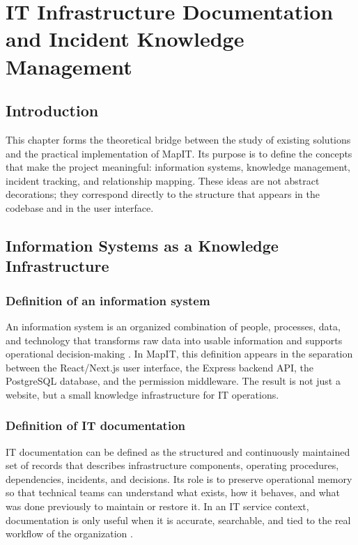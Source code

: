 \chapter{IT Infrastructure Documentation and Incident Knowledge Management}

\section{Introduction}
This chapter forms the theoretical bridge between the study of existing solutions and the practical implementation of MapIT. Its purpose is to define the concepts that make the project meaningful: information systems, knowledge management, incident tracking, and relationship mapping. These ideas are not abstract decorations; they correspond directly to the structure that appears in the codebase and in the user interface.

\section{Information Systems as a Knowledge Infrastructure}
\subsection{Definition of an information system}
An information system is an organized combination of people, processes, data, and technology that transforms raw data into usable information and supports operational decision-making \cite{laudon_mis,pressman}. In MapIT, this definition appears in the separation between the React/Next.js user interface, the Express backend API, the PostgreSQL database, and the permission middleware. The result is not just a website, but a small knowledge infrastructure for IT operations.

\subsection{Definition of IT documentation}
IT documentation can be defined as the structured and continuously maintained set of records that describes infrastructure components, operating procedures, dependencies, incidents, and decisions. Its role is to preserve operational memory so that technical teams can understand what exists, how it behaves, and what was done previously to maintain or restore it. In an IT service context, documentation is only useful when it is accurate, searchable, and tied to the real workflow of the organization \cite{itil4,km}.

